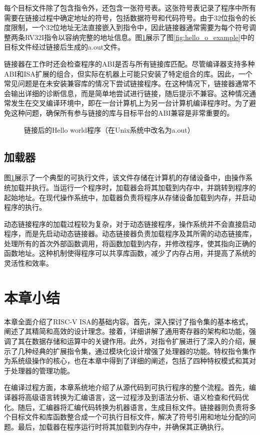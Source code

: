 每个目标文件除了包含指令外，还包含一张符号表。这张符号表记录了程序中所有需要在链接过程中确定地址的符号，包括数据符号和代码符号。由于32位指令的长度限制，一个32位地址无法直接嵌入到指令中，因此链接器通常需要为每个符号调整两条RV32I指令以容纳完整的地址信息。图\ref{fig:hello_out_example}展示了图\ref{fig:hello_o_example}中的目标文件经过链接后生成的a.out文件。

链接器在工作时还会检查程序的ABI是否与所有链接库匹配。尽管编译器支持多种ABI和ISA扩展的组合，但实际在机器上可能只安装了特定组合的库。因此，一个常见问题是在未安装兼容库的情况下尝试链接程序。在这种情况下，链接器通常不会输出详细的诊断信息，而是简单地尝试进行链接，随后提示不兼容。这种情况通常发生在交叉编译环境中，即在一台计算机上为另一台计算机编译程序时。为了避免这种问题，确保所有参与链接的库与目标平台的ABI兼容是非常重要的。

\begin{figure}[htbp]
	\centering
	
	\caption{链接后的Hello world程序（在Unix系统中改名为a.out）}
	\label{fig:hello_out_example}
\end{figure}

\subsection{加载器}

图\ref{fig:hello_out_example}展示了一个典型的可执行文件，该文件存储在计算机的存储设备中，由操作系统加载并执行。当运行一个程序时，加载器会将其加载到内存中，并跳转到程序的起始地址。在现代操作系统中，加载器负责将程序从存储设备加载到内存，并启动程序的执行。

动态链接程序的加载过程较为复杂，对于动态链接程序，操作系统并不会直接启动程序，而是先启动动态链接器。动态链接器负责加载程序及其所需的动态链接库，处理所有的首次外部函数调用，将函数加载到内存，并修改程序，使其指向正确的函数地址。这种机制使得程序可以共享库函数，减少了内存占用，并提高了系统的灵活性和效率。

\section{本章小结}

本章全面介绍了RISC-V ISA的基础内容。首先，深入探讨了指令集的基本格式，阐述了其精简和高效的设计理念。接着，详细讲解了通用寄存器的架构和功能，强调了其在数据存储和运算中的关键作用。此外，对指令扩展进行了深入的介绍，展示了几种经典的扩展指令集，通过模块化设计增强了处理器的功能。特权指令集作为系统级操作的核心，也在本章中得到了详细的阐述，包括了四种特权模式和其对于处理器的管理功能。

在编译过程方面，本章系统地介绍了从源代码到可执行程序的整个流程。首先，编译器将高级语言转换为汇编语言，这一过程涉及到语法分析、语义检查和代码优化。随后，汇编器将汇编代码转换为机器语言，生成目标文件。链接器则负责将多个目标文件和库函数整合成一个可执行目标文件，解决了符号引用和地址分配的问题。最后，加载器在程序运行时将其加载到内存中，并确保其正确执行。